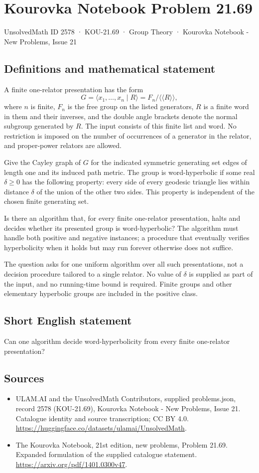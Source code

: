 \documentclass[11pt,a4paper]{article}
\begin{document}
\section*{Kourovka Notebook Problem 21.69}\label{2578}
{\small UnsolvedMath ID 2578 · KOU-21.69 · Group Theory · Kourovka Notebook - New Problems, Issue 21}
\subsection{Definitions and mathematical statement}
A finite one-relator presentation has the form
\[
 G=\langle x_1,\ldots,x_n\mid R\rangle
   =F_n/\langle\!\langle R\rangle\!\rangle,
\]
where $n$ is finite, $F_n$ is the free group on the listed generators,
$R$ is a finite word in them and their inverses, and the double angle
brackets denote the normal subgroup generated by $R$.
The input consists of this finite list and word. No restriction is
imposed on the number of occurrences of a generator in the relator,
and proper-power relators are allowed.

Give the Cayley graph of $G$ for the indicated symmetric generating
set edges of length one and its induced path metric. The group is
word-hyperbolic if some real $\delta\ge0$ has the following property:
every side of every geodesic triangle lies within distance $\delta$
of the union of the other two sides. This property is independent
of the chosen finite generating set.

Is there an algorithm that, for every finite one-relator presentation,
halts and decides whether its presented group is word-hyperbolic?
The algorithm must handle both positive and negative instances; a
procedure that eventually verifies hyperbolicity when it holds but
may run forever otherwise does not suffice.

The question asks for one uniform algorithm over all such presentations,
not a decision procedure tailored to a single relator. No value of
$\delta$ is supplied as part of the input, and no running-time bound
is required. Finite groups and other elementary hyperbolic groups are
included in the positive class.
\subsection{Short English statement}
Can one algorithm decide word-hyperbolicity from every finite one-relator presentation?
\subsection{Sources}
\begin{itemize}
\item[S1] ULAM.AI and the UnsolvedMath Contributors, supplied problems.json, record 2578 (KOU-21.69), Kourovka Notebook - New Problems, Issue 21. Catalogue identity and source transcription; CC BY 4.0.
\url{https://huggingface.co/datasets/ulamai/UnsolvedMath}.
\item[S2] The Kourovka Notebook, 21st edition, new problems, Problem 21.69. Expanded formulation of the supplied catalogue statement.
\url{https://arxiv.org/pdf/1401.0300v47}.
\end{itemize}
\end{document}
